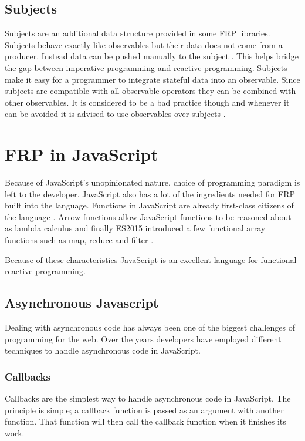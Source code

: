 \subsection{Subjects} \label{subjects}

Subjects are an additional data structure provided in some FRP libraries. Subjects behave exactly like observables but their data does not come from a producer. Instead data can be pushed manually to the subject \cite{subjects}. This helps bridge the gap between imperative programming and reactive programming. Subjects make it easy for a programmer to integrate stateful data into an observable. Since subjects are compatible with all observable operators they can be combined with other observables. It is considered to be a bad practice though and whenever it can be avoided it is advised to use observables over subjects \cite{subjects}.

\section{FRP in JavaScript}

Because of JavaScript's unopinionated nature, choice of programming paradigm is left to the developer. JavaScript also has a lot of the ingredients needed for FRP built into the language. Functions in JavaScript are already first-class citizens of the language \cite{func-js}. Arrow functions allow JavaScript functions to be reasoned about as lambda calculus and finally ES2015 introduced a few functional array functions such as map, reduce and filter \cite{es2015}.

Because of these characteristics JavaScript is an excellent language for functional reactive programming.

\subsection{Asynchronous Javascript}

Dealing with asynchronous code has always been one of the biggest challenges of programming for the web. Over the years developers have employed different techniques to handle asynchronous code in JavaScript.

\subsubsection{Callbacks}

Callbacks are the simplest way to handle asynchronous code in JavaScript. The principle is simple; a callback function is passed as an argument with another function. That function will then call the callback function when it finishes its work.

